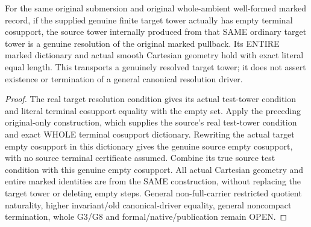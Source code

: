\begin{theorem}
\label{hir:submersion-marked-cartesian-tower-terminal-transport}
\leanok
{}
For the same original submersion and original whole-ambient well-formed
marked record, if the supplied genuine finite target tower actually has
empty terminal cosupport, the source tower internally produced from that
SAME ordinary target tower is a genuine resolution of the original marked
pullback. Its ENTIRE marked dictionary and actual smooth Cartesian geometry
hold with exact literal equal length. This transports a genuinely resolved
target tower; it does not assert existence or termination of a general
canonical resolution driver.
\end{theorem}
\begin{proof}
The real target resolution condition gives its actual test-tower condition
and literal terminal cosupport equality with the empty set. Apply the
preceding original-only construction, which supplies the source's real
test-tower condition and exact WHOLE terminal cosupport dictionary. Rewriting
the actual target empty cosupport in this dictionary gives the genuine
source empty cosupport, with no source terminal certificate assumed.
Combine its true source test condition with this genuine empty cosupport.
All actual Cartesian geometry and entire marked identities are from the
SAME construction, without replacing the target tower or deleting empty
steps. General non-full-carrier restricted quotient naturality, higher
invariant/old canonical-driver equality, general noncompact termination,
whole G3/G8 and formal/native/publication remain OPEN.
\end{proof}

